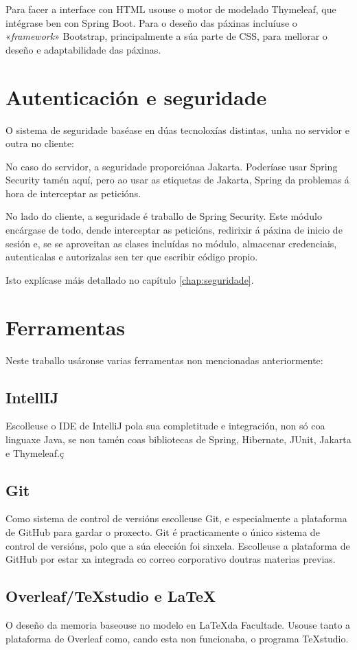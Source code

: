 Para facer a interface con HTML usouse o motor de modelado Thymeleaf, que intégrase ben con Spring Boot. Para o deseño das páxinas incluíuse o «\textit{framework}» Bootstrap, principalmente a súa parte de CSS, para mellorar o deseño e adaptabilidade das páxinas.

\section{Autenticación e seguridade}
\label{sec:seguridade}

O sistema de seguridade baséase en dúas tecnoloxías distintas, unha no servidor e outra no cliente:

No caso do servidor, a seguridade proporciónaa Jakarta. Poderíase usar Spring Security tamén aquí, pero ao usar as etiquetas de Jakarta, Spring da problemas á hora de interceptar as peticións.

No lado do cliente, a seguridade é traballo de Spring Security. Este módulo encárgase de todo, dende interceptar as peticións, redirixir á páxina de inicio de sesión e, se se aproveitan as clases incluídas no módulo, almacenar credenciais, autenticalas e autorizalas sen ter que escribir código propio.

Isto explícase máis detallado no capítulo \ref{chap:seguridade}.

\newpage

\section{Ferramentas}
\label{sec:ferramentas}

Neste traballo usáronse varias ferramentas non mencionadas anteriormente:

\subsection{IntellIJ}

Escolleuse o IDE de IntelliJ pola sua completitude e integración, non só coa linguaxe Java, se non tamén coas bibliotecas de Spring, Hibernate, JUnit, Jakarta e Thymeleaf.\cite{intellij}ç

\subsection{Git}

Como sistema de control de versións escolleuse Git, e especialmente a plataforma de GitHub para gardar o proxecto. Git é practicamente o único sistema de control de versións, polo que a súa elección foi sinxela. Escolleuse a plataforma de GitHub por estar xa integrada co correo corporativo doutras materias previas.

\subsection{Overleaf/TeXstudio e \LaTeX}

O deseño da memoria baseouse no modelo en \LaTeX da Facultade. Usouse tanto a plataforma de Overleaf como, cando esta non funcionaba, o programa TeXstudio.